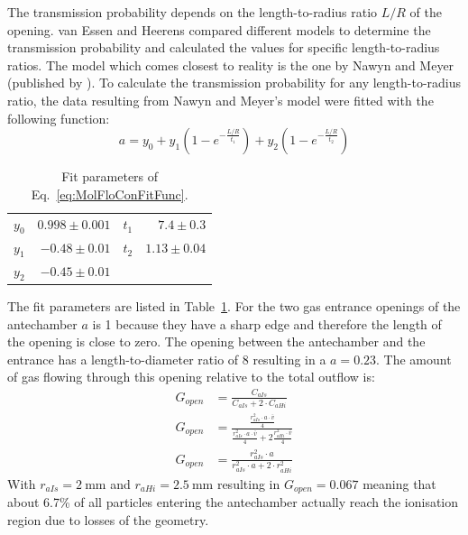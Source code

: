 	The transmission probability depends on the length-to-radius ratio $L/R$ of the opening. van Essen and Heerens \cite{molFlowTubeTransm_Essen1976} compared different models to determine the transmission probability and calculated the values for specific length-to-radius ratios. The model which comes closest to reality is the one by Nawyn and Meyer (published by \cite{molFlowTubeTransm_Essen1976}). To calculate the transmission probability for any length-to-radius ratio, the data resulting from Nawyn and Meyer's model were fitted with the following function:
	\begin{equation}
		a = y_0 + y_1\left(1-e^{-\frac{L/R}{t_1}}\right) + y_2\left(1-e^{-\frac{L/R}{t_2}}\right)
		\label{eq:MolFloConFitFunc}
	\end{equation}
	
	\begin{table}[H]
		\begin{center}
			\begin{tabular}{|l r| l r|}
				\hline
				$y_0$	& $0.998 \pm 0.001$ & $t_1$	& $7.4 \pm 0.3$	\\
				$y_1$	& $-0.48 \pm 0.01$ & $t_2$	& $1.13 \pm 0.04$ \\
				$y_2$ 	& $-0.45 \pm 0.01$	& &\\
				\hline
			\end{tabular}
		\end{center}
		\caption{Fit parameters of Eq.~\eqref{eq:MolFloConFitFunc}.}
		\label{tab:thMolFloConFiPara}
	\end{table}
The fit parameters are listed in Table~\ref{tab:thMolFloConFiPara}. For the two gas entrance openings of the antechamber $a$ is 1 because they have a sharp edge and therefore the length of the opening is close to zero. 
The opening between the antechamber and the entrance has a length-to-diameter ratio of 8 resulting in a $a = 0.23$. The amount of gas flowing through this opening relative to the total outflow is:
	\begin{align}
		G_{open} & = \frac{C_{aIs}}{C_{aIs} + 2\cdot C_{aHi}} \label{eq:GAntOpen}\\
		G_{open} & = \frac{\frac{r_{aIs}^2\cdot a\cdot \bar{v}}{4}}{\frac{r_{aIs}^2\cdot a\cdot \bar{v}}{4} + 2\frac{r_{aHi}^2\cdot \bar{v}}{4}}\\
		G_{open} &= \frac{r_{aIs}^2\cdot a}{r_{aIs}^2\cdot a + 2\cdot r_{aHi}^2}
		\label{eq:geoOpenTube}
	\end{align}
	With $r_{aIs} = 2~\si{\milli\meter}$ and $r_{aHi} = 2.5~\si{\milli\meter}$ resulting in $G_{open} = 0.067$ meaning that about 6.7\% of all particles entering the antechamber actually reach the ionisation region due to losses of the geometry.\\
